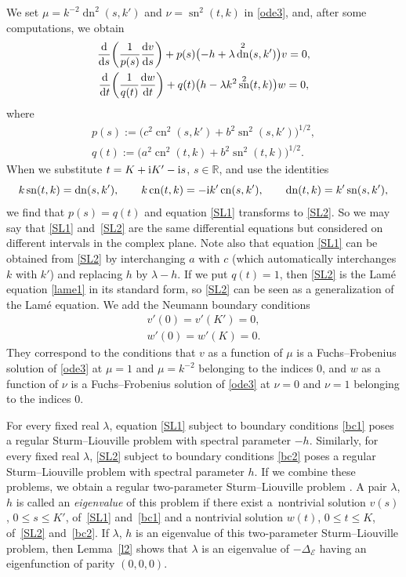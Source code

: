 \documentclass[10pt,a4paper]{amsart}
\newcommand{\R}{\mathbb{R}}
\newcommand{\E}{\mathcal{E}}
\newcommand{\D}{\Delta_\E}
\DeclareMathOperator{\sn}{sn}
\DeclareMathOperator{\cn}{cn}
\DeclareMathOperator{\dn}{dn}
\numberwithin{equation}{section}
\begin{document}
We set $\mu=k^{-2}\dn^2(s,k')$ and $\nu=\sn^2(t,k)$ in \eqref{ode3}, and, after some computations, we obtain
\begin{gather}\label{SL1}
\frac{{\rm d}}{{\rm d}s}\biggl(\frac{1}{p(s)}\frac{{\rm d}v}{{\rm d}s}\biggr)+p(s)\bigl(-h+\lambda \dn^2(s,k')\bigr) v=0,\\
\frac{{\rm d}}{{\rm d}t}\biggl(\frac{1}{q(t)}\frac{{\rm d}w}{{\rm d}t}\biggr)+q(t)\bigl(h-\lambda k^2\sn^2(t,k)\bigr)w=0, \label{SL2}
\end{gather}
where
\begin{gather}
 p(s) := \bigl(c^2\cn^2(s,k')+b^2\sn^2(s,k')\bigr)^{1/2},\label{p}\\
 q(t) := \bigl(a^2\cn^2(t,k)+b^2\sn^2(t,k)\bigr)^{1/2}\label{q}.
\end{gather}
When we substitute $t=K+ {\rm i}K'-{\rm i}s$, $s\in\R$, and use the identities
\[ k\sn(t,k)=\dn(s,k'),\qquad k\cn(t,k)=-{\rm i}k'\cn(s,k'),\qquad \dn(t,k)=k'\sn(s,k'),\]
we find that $p(s)=q(t)$ and equation \eqref{SL1} transforms to \eqref{SL2}.
So we may say that \eqref{SL1} and~\eqref{SL2} are the same differential equations but considered on different intervals
in the complex plane.
Note also that equation \eqref{SL1} can be obtained from \eqref{SL2} by interchanging $a$ with $c$ (which automatically
interchanges $k$ with $k'$) and replacing $h$ by $\lambda-h$.
If we put $q(t)=1$, then \eqref{SL2} is the Lam\'e equation \eqref{lame1} in its standard form, so \eqref{SL2} can be seen as a generalization of the Lam\'e equation.
We add the Neumann boundary conditions
\begin{gather}\label{bc1}
v'(0) = v'(K')=0, \\
w'(0) = w'(K)=0.\label{bc2}
\end{gather}
They
correspond to the conditions that $v$ as a function of $\mu$ is a Fuchs--Frobenius solution of \eqref{ode3} at $\mu=1$ and $\mu=k^{-2}$ belonging to the indices $0$, and $w$ as a function of $\nu$ is a Fuchs--Frobenius solution of \eqref{ode3}
at $\nu=0$ and $\nu=1$ belonging to the indices $0$.

For every fixed real $\lambda$, equation \eqref{SL1} subject to boundary conditions \eqref{bc1} poses
a regular Sturm--Liouville problem \cite[Section~27]{W} with spectral parameter $-h$.
Similarly, for every fixed real $\lambda$, \eqref{SL2} subject to boundary conditions \eqref{bc2} poses
a regular Sturm--Liouville problem with spectral parameter $h$.
If we combine these problems, we obtain a regular two-parameter Sturm--Liouville problem \cite{AM}.
A pair $\lambda$, $h$ is called an
{\it eigenvalue} of this problem if there exist a~nontrivial solution $v(s)$, $0\le s\le K'$, of~\eqref{SL1} and~\eqref{bc1}
and a nontrivial solution $w(t)$, $0\le t\le K$, of~\eqref{SL2} and~\eqref{bc2}.
If $\lambda$, $h$ is an eigenvalue of this two-parameter Sturm--Liouville problem, then Lemma~\ref{l2}
shows that $\lambda$ is an eigenvalue of $-\D$ having an eigenfunction of parity $(0,0,0)$.
\end{document}
